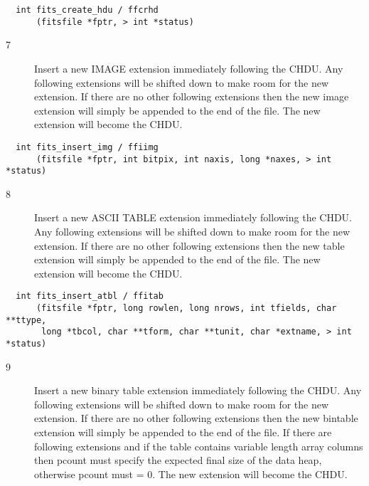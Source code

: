 \begin{verbatim}
  int fits_create_hdu / ffcrhd
      (fitsfile *fptr, > int *status)
\end{verbatim}

\begin{description}
\item[7 ] Insert a new IMAGE extension immediately following the CHDU.
    Any following extensions will be shifted down to make room for
    the new extension.  If there are no other following extensions
    then the new image extension will simply be appended to the
   end of the file.  The new extension will become the CHDU.
\end{description}

\begin{verbatim}
  int fits_insert_img / ffiimg
      (fitsfile *fptr, int bitpix, int naxis, long *naxes, > int *status)
\end{verbatim}

\begin{description}
\item[8 ] Insert a new ASCII TABLE extension immediately following the CHDU.
    Any following extensions will be shifted down to make room for
    the new extension.  If there are no other following extensions
    then the new table extension will simply be appended to the
   end of the file.  The new extension will become the CHDU.
\end{description}

\begin{verbatim}
  int fits_insert_atbl / ffitab
      (fitsfile *fptr, long rowlen, long nrows, int tfields, char **ttype,
       long *tbcol, char **tform, char **tunit, char *extname, > int *status)
\end{verbatim}

\begin{description}
\item[9 ] Insert a new binary table extension immediately following the CHDU.
    Any following extensions will be shifted down to make room for
    the new extension.  If there are no other following extensions
    then the new bintable extension will simply be appended to the
    end of the file.  If there are following extensions and if
    the table contains variable length array columns
    then pcount must specify the expected final size of the data heap,
    otherwise pcount must = 0.  The new extension will become the CHDU.
\end{description}

